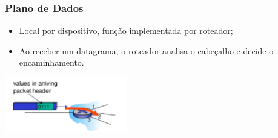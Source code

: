         \subsubsection*{Plano de Dados}
            \begin{itemize}[left=0.5cm, align=left, nosep]
                \item Local por dispositivo, função implementada por roteador;
                \item Ao receber um datagrama, o roteador analisa o cabeçalho e decide o encaminhamento.
            \end{itemize}

            \begin{center}
                \includegraphics[width=0.4\textwidth]{img/cap-04/plano-de-dados.png}
            \end{center}

